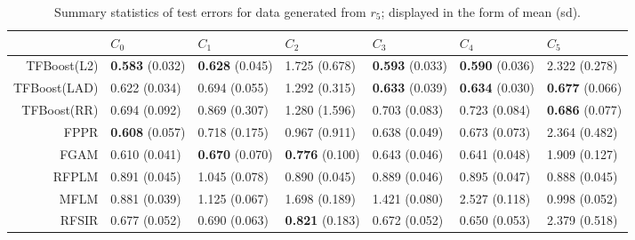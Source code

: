 \begin{table}[H]
\centering
\footnotesize

\begin{tabular}{rllllll}
  \hline
 & $C_0$ & $C_1$ & $C_2$ & $C_3$ & $C_4$ & $C_5$ \\ 
  \hline
TFBoost(L2) & \textbf{0.583} (0.032) & \textbf{0.628} (0.045) & 1.725 (0.678) & \textbf{0.593} (0.033) & \textbf{0.590} (0.036) & 2.322 (0.278) \\ 
  TFBoost(LAD) & 0.622 (0.034) & 0.694 (0.055) & 1.292 (0.315) & \textbf{0.633} (0.039) & \textbf{0.634} (0.030) & \textbf{0.677} (0.066) \\ 
  TFBoost(RR) & 0.694 (0.092) & 0.869 (0.307) & 1.280 (1.596) & 0.703 (0.083) & 0.723 (0.084) & \textbf{0.686} (0.077) \\ 
  FPPR & \textbf{0.608} (0.057) & 0.718 (0.175) & 0.967 (0.911) & 0.638 (0.049) & 0.673 (0.073) & 2.364 (0.482) \\ 
  FGAM & 0.610 (0.041) & \textbf{0.670} (0.070) & \textbf{0.776} (0.100) & 0.643 (0.046) & 0.641 (0.048) & 1.909 (0.127) \\ 
  RFPLM & 0.891 (0.045) & 1.045 (0.078) & 0.890 (0.045) & 0.889 (0.046) & 0.895 (0.047) & 0.888 (0.045) \\ 
  MFLM & 0.881 (0.039) & 1.125 (0.067) & 1.698 (0.189) & 1.421 (0.080) & 2.527 (0.118) & 0.998 (0.052) \\ 
  RFSIR & 0.677 (0.052) & 0.690 (0.063) & \textbf{0.821} (0.183) & 0.672 (0.052) & 0.650 (0.053) & 2.379 (0.518) \\ 
   \hline
\end{tabular}
\caption{Summary statistics of test errors for data generated from $r_5$; displayed in the form of mean (sd).} 
\end{table}
\renewcommand{\arraystretch}{1.5}
\addtolength{\tabcolsep}{3pt}    
